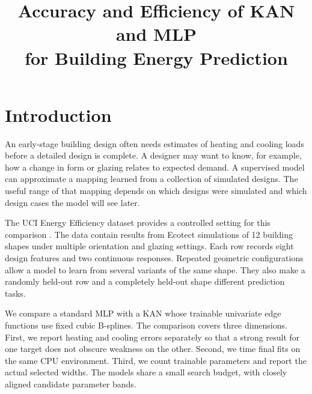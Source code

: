 \documentclass[11pt,twocolumn,letterpaper]{article}
\title{\bfseries Accuracy and Efficiency of KAN and MLP\\for Building Energy Prediction}
\author{}
\date{}
\begin{document}

\section{Introduction}
An early-stage building design often needs estimates of heating and cooling loads before a detailed design is complete. A designer may want to know, for example, how a change in form or glazing relates to expected demand. A supervised model can approximate a mapping learned from a collection of simulated designs. The useful range of that mapping depends on which designs were simulated and which design cases the model will see later.

The UCI Energy Efficiency dataset provides a controlled setting for this comparison \cite{uci}. The data contain results from Ecotect simulations of 12 building shapes under multiple orientation and glazing settings. Each row records eight design features and two continuous responses. Repeated geometric configurations allow a model to learn from several variants of the same shape. They also make a randomly held-out row and a completely held-out shape different prediction tasks.

We compare a standard MLP with a KAN whose trainable univariate edge functions use fixed cubic B-splines. The comparison covers three dimensions. First, we report heating and cooling errors separately so that a strong result for one target does not obscure weakness on the other. Second, we time final fits on the same CPU environment. Third, we count trainable parameters and report the actual selected widths. The models share a small search budget, with closely aligned candidate parameter bands.
\end{document}
